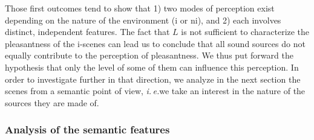 \documentclass[12pt]{elsarticle}
\newcommand{\ie}{\emph{i.\,e.}}
\begin{document}
Those first outcomes tend to show that 1) two modes of perception exist depending on the nature of the environment (i or ni), and 2) each involves distinct, independent features. The fact that $L$ is not sufficient to characterize the pleasantness of the i-scenes can lead us to conclude that all sound sources do not equally contribute to the perception of pleasantness. We thus put forward the hypothesis that only the level of some of them can influence this perception. In order to investigate further in that direction, we analyze in the next section the scenes from a semantic point of view, \ie we take an interest in the nature of the sources they are made of.

\subsubsection*{Analysis of the semantic features}
\end{document}
